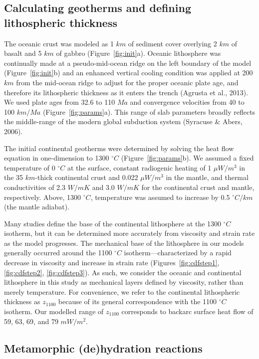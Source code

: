 \documentclass[draft,linenumbers]{agujournal2018}
\begin{document}
\subsection{Calculating geotherms and defining lithospheric thickness}

The oceanic crust was modeled as 1 \(km\) of sediment cover overlying 2
\(km\) of basalt and 5 \(km\) of gabbro (Figure~\ref{fig:init}a).
Oceanic lithosphere was continually made at a pseudo-mid-ocean ridge on
the left boundary of the model (Figure~\ref{fig:init}b) and an enhanced
vertical cooling condition was applied at 200 \(km\) from the mid-ocean
ridge to adjust for the proper oceanic plate age, and therefore its
lithospheric thickness as it enters the trench (Agrusta et al., 2013).
We used plate ages from 32.6 to 110 \(Ma\) and convergence velocities
from 40 to 100 \(km/Ma\) (Figure~\ref{fig:params}a). This range of slab
parameters broadly reflects the middle-range of the modern global
subduction system (Syracuse \& Abers, 2006).

The initial continental geotherms were determined by solving the heat
flow equation in one-dimension to 1300 \(^{\circ}C\)
(Figure~\ref{fig:params}b). We assumed a fixed temperature of 0
\(^{\circ}C\) at the surface, constant radiogenic heating of 1
\(\mu W/m^{3}\) in the 35 \(km\)-thick continental crust and 0.022
\(\mu W/m^{3}\) in the mantle, and thermal conductivities of 2.3
\(W/mK\) and 3.0 \(W/mK\) for the continental crust and mantle,
respectively. Above, 1300 \(^{\circ}C\), temperature was assumed to
increase by 0.5 \(^{\circ}C/km\) (the mantle adiabat).

Many studies define the base of the continental lithosphere at the 1300
\(^{\circ}C\) isotherm, but it can be determined more accurately from
viscosity and strain rate as the model progresses. The mechanical base
of the lithosphere in our models generally occurred around the 1100
\(^{\circ}C\) isotherm---characterized by a rapid decrease in viscosity
and increase in strain rate
(Figures~\ref{fig:cdfstep1}, \ref{fig:cdfstep2}, \ref{fig:cdfstep3}). As
such, we consider the oceanic and continental lithosphere in this study
as mechanical layers defined by viscosity, rather than merely
temperature. For convenience, we refer to the continental lithospheric
thickness as \(z_{1100}\) because of its general correspondence with the
1100 \(^{\circ}C\) isotherm. Our modelled range of \(z_{1100}\)
corresponds to backarc surface heat flow of 59, 63, 69, and 79
\(mW/m^{2}\).

\subsection{Metamorphic (de)hydration reactions}
\end{document}
